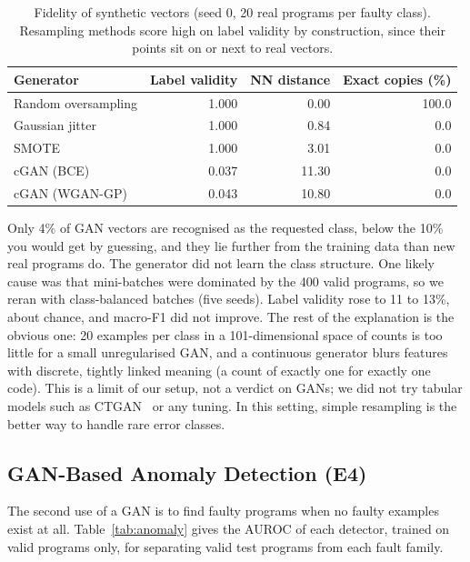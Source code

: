 \documentclass[12pt,a4paper]{article}
\begin{document}
\begin{table}[!htbp]
\centering
\caption{Fidelity of synthetic vectors (seed 0, 20 real programs per faulty class). Resampling methods score high on
label validity by construction, since their points sit on or next to real vectors.}
\label{tab:fidelity}
\small
\begin{tabular}{lrrr}
\toprule
\textbf{Generator} & \textbf{Label validity} & \textbf{NN distance} & \textbf{Exact copies (\%)}\\
\midrule
Random oversampling & 1.000 & 0.00 & 100.0\\
Gaussian jitter & 1.000 & 0.84 & 0.0\\
SMOTE & 1.000 & 3.01 & 0.0\\
cGAN (BCE) & 0.037 & 11.30 & 0.0\\
cGAN (WGAN-GP) & 0.043 & 10.80 & 0.0\\\bottomrule
\end{tabular}

\end{table}

Only 4\% of GAN vectors are recognised as the requested class, below the 10\% you would get by guessing, and they lie
further from the training data than new real programs do. The generator did not learn the class structure. One likely
cause was that mini-batches were dominated by the 400 valid programs, so we reran with class-balanced batches (five
seeds). Label validity rose to 11 to 13\%, about chance, and macro-F1 did not improve. The rest of the explanation is the
obvious one: 20 examples per class in a 101-dimensional space of counts is too little for a small unregularised GAN, and
a continuous generator blurs features with discrete, tightly linked meaning (a count of exactly one for exactly one
code). This is a limit of our setup, not a verdict on GANs; we did not try tabular models such as CTGAN~\cite{xu2019} or
any tuning. In this setting, simple resampling is the better way to handle rare error classes.

\subsection{GAN-Based Anomaly Detection (E4)}

The second use of a GAN is to find faulty programs when no faulty examples exist at all. Table~\ref{tab:anomaly} gives
the AUROC of each detector, trained on valid programs only, for separating valid test programs from each fault family.
\end{document}
